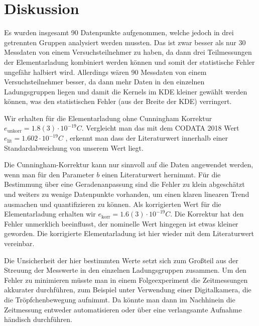 \section{Diskussion}
Es wurden insgesamt 90 Datenpunkte aufgenommen, welche jedoch in drei getrennten Gruppen analysiert werden mussten. Das ist zwar besser als nur 30 Messdaten von einem Versuchsteilnehmer zu haben, da dann drei Teilmessungen der Elementarladung kombiniert werden können und somit der statistische Fehler ungefähr halbiert wird. Allerdings wären 90 Messdaten von einem Versuchsteilnehmer besser, da dann mehr Daten in den einzelnen Ladungsgruppen liegen und damit die Kernels im KDE kleiner gewählt werden können, was den statistischen Fehler (aus der Breite der KDE) verringert. 

Wir erhalten für die Elementarladung ohne Cunningham Korrektur \( e_{\text{unkorr}} = 1.8(3) \cdot 10^{-19} \unit{C} \). Vergleicht man das mit dem CODATA 2018 Wert \( e_{\text{lit}} = 1.602 \cdot 10^{-19} \unit{C} \) \cite{codata}, erkennt man dass der Literaturwert innerhalb einer Standardabweichung von unserem Wert liegt. 

Die Cunningham-Korrektur kann nur sinnvoll auf die Daten angewendet werden, wenn man für den Parameter \( b \) einen Literaturwert hernimmt. Für die Bestimmung über eine Geradenanpassung sind die Fehler zu klein abgeschätzt und weiters zu wenige Datenpunkte vorhanden, um einen klaren linearen Trend ausmachen und quantifizieren zu können. Als korrigierten Wert für die Elementarladung erhalten wir \( e_{\text{korr}} = 1.6(3) \cdot 10^{-19} \unit{C} \). Die Korrektur hat den Fehler unmerklich beeinflusst, der nominelle Wert hingegen ist etwas kleiner geworden. Die korrigierte Elementarladung ist hier wieder mit dem Literaturwert vereinbar.

Die Unsicherheit der hier bestimmten Werte setzt sich zum Großteil aus der Streuung der Messwerte in den einzelnen Ladungsgruppen zusammen. Um den Fehler zu minimieren müsste man in einem Folgeexperiment die Zeitmessungen akkurater durchführen, zum Beispiel unter Verwendung einer Digitalkamera, die die Tröpfchenbewegung aufnimmt. Da könnte man dann im Nachhinein die Zeitmessung entweder automatisieren oder über eine verlangsamte Aufnahme händisch durchführen.
